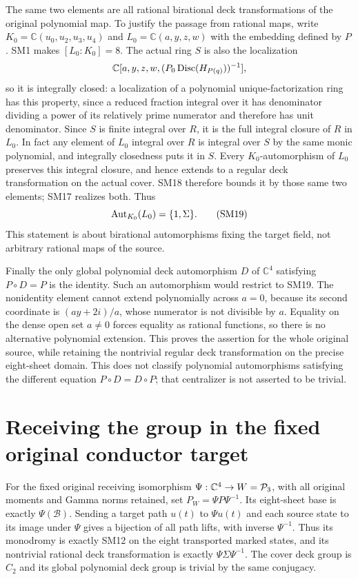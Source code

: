 \documentclass[11pt]{article}
\newcommand{\C}{\mathbb C}
\begin{document}
The same two elements are all rational birational deck
transformations of the original polynomial map. To justify the
passage from rational maps, write $K_0=\C(u_0,u_2,u_3,u_4)$
and $L_0=\C(a,y,z,w)$ with the embedding defined by $P$.
SM1 makes $[L_0:K_0]=8$. The actual ring $S$ is also the
localization
\[
 \C[a,y,z,w,(P_0\Disc(H_{P(q)}))^{-1}],
\]
so it is integrally closed: a localization of a polynomial
unique-factorization ring has this property, since a reduced
fraction integral over it has denominator dividing a power of
its relatively prime numerator and therefore has unit denominator.
Since $S$ is finite integral over $R$, it is the full integral
closure of $R$ in $L_0$. In fact any element of $L_0$ integral
over $R$ is integral over $S$ by the same monic polynomial,
and integrally closedness puts it in $S$.
Every $K_0$-automorphism of $L_0$ preserves this integral closure,
and hence extends to a regular deck transformation on the actual
cover. SM18 therefore bounds it by those same two elements;
SM17 realizes both. Thus
\begin{equation}
 \operatorname{Aut}_{K_0}(L_0)=\{1,\Sigma\}.\tag{SM19}
\end{equation}
This statement is about birational automorphisms fixing the
target field, not arbitrary rational maps of the source.

Finally the only global polynomial deck automorphism $D$ of $\C^4$
satisfying $P\circ D=P$ is the identity. Such an automorphism would
restrict to SM19. The nonidentity element cannot extend
polynomially across $a=0$, because its second coordinate is
$(ay+2i)/a$, whose numerator is not divisible by $a$.
Equality on the dense open set $a\ne0$ forces equality as
rational functions, so there is no alternative polynomial
extension. This proves the assertion for the whole original
source, while retaining the nontrivial regular deck
transformation on the precise eight-sheet domain. This does not
classify polynomial automorphisms satisfying the different equation
$P\circ D=D\circ P$; that centralizer is not asserted to be trivial.

\section{Receiving the group in the fixed original conductor target}
For the fixed original receiving isomorphism
$\Psi:\C^4\to W=\cP_3$, with all original moments and Gamma
norms retained, set $P_W=\Psi P\Psi^{-1}$. Its eight-sheet
base is exactly $\Psi(\mathcal B)$. Sending a target path
$u(t)$ to $\Psi u(t)$ and each source state to its image under
$\Psi$ gives a bijection of all path lifts, with inverse
$\Psi^{-1}$. Thus its monodromy is exactly SM12 on the eight
transported marked states, and its nontrivial rational deck
transformation is exactly $\Psi\Sigma\Psi^{-1}$. The cover
deck group is $C_2$ and its global polynomial deck group is
trivial by the same conjugacy.
\end{document}
